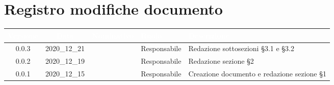 \section*{Registro modifiche documento}
{
\renewcommand{\arraystretch}{1.5}
\centering
\begin{longtable}{ c c  C{2.3cm} C{3cm} C{3.2cm}}


 \textcolor{white}{\textbf{Versione}}&
    \textcolor{white}{\textbf{Data}}&
    \textcolor{white}{\textbf{Nominativo}}&
    \textcolor{white}{\textbf{Ruolo}}&
    \textcolor{white}{\textbf{Descrizione}}\\	
    \endhead
    
    0.0.3 & 2020\_12\_21 & \MM{} & Responsabile  & Redazione sottosezioni §3.1 e §3.2 \\

    0.0.2 & 2020\_12\_19 & \MM{} & Responsabile  & Redazione sezione §2\\

    0.0.1 & 2020\_12\_15 & \MM{} & Responsabile  & Creazione documento e redazione sezione §1\\
			
\end{longtable}
}
